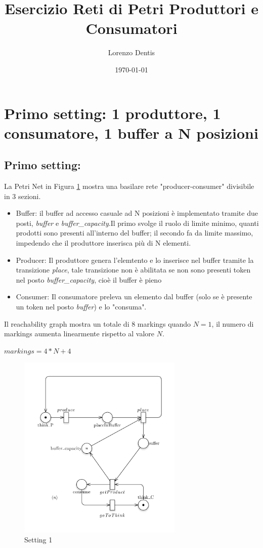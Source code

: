 \documentclass{article}
\begin{document}
\title{Esercizio Reti di Petri Produttori e Consumatori}
\author{Lorenzo Dentis}

\date{\today}

\maketitle

\section{Primo setting: 1 produttore, 1 consumatore, 1 buffer a N posizioni}\label{SEC:primo}
\subsection{Primo setting:}
La Petri Net in Figura \ref{FIG:setting1} mostra una basilare rete "producer-consumer" divisibile in 3 sezioni.
\begin{itemize}
	\item Buffer: il buffer ad accesso casuale ad N posizioni è implementato tramite due posti, \emph{buffer} e \emph{buffer\_capacity}.Il primo svolge il ruolo di limite minimo, quanti prodotti sono presenti all'interno del buffer; il secondo fa da limite massimo, impedendo che il produttore inserisca più di N elementi.
	\item Producer: Il produttore genera l'elemtento e lo inserisce nel buffer tramite la transizione \emph{place}, tale transizione non è abilitata se non sono presenti token nel posto \emph{buffer\_capacity}, cioè il buffer è pieno
	\item Consumer: Il consumatore preleva un elemento dal buffer (solo se è presente un token nel posto \emph{buffer}) e lo "consuma".
\end{itemize}
Il reachability graph mostra un totale di 8 markings quando $N =1$, il numero di markings aumenta linearmente rispetto al valore $N$.\begin{center}$markings = 4*N + 4$\end{center}
\begin{figure}[!h]
\centering
\includegraphics[width=0.7\textwidth]{./Esercizio2_img/setting1.png}
\caption{Setting 1} \label{FIG:setting1}
\end{figure}
\end{document}
